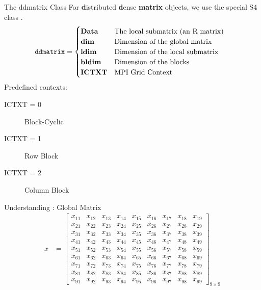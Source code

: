 \begin{frame}
  \begin{block}{The ddmatrix Class}\pause
    For \textbf{d}istributed \textbf{d}ense \textbf{matrix} objects,
    we use the special S4 class .
    \begin{align*}
      \hspace{.1cm}\text{\code{ddmatrix}}&=\begin{cases}
        $\textbf{Data}$ & $The local submatrix (an R matrix)$\\
        $\textbf{dim}$ & $Dimension of the global matrix$\\
        $\textbf{ldim}$ & $Dimension of the local submatrix$\\
        $\textbf{bldim}$ & $Dimension of the blocks$\\
        $\textbf{ICTXT}$ & $MPI Grid Context$
      \end{cases}
    \end{align*}
    Predefined contexts:
    \begin{description}
      \item[ICTXT = 0] Block-Cyclic
      \item[ICTXT = 1] Row Block
      \item[ICTXT = 2] Column Block
    \end{description}
  \end{block}
\end{frame}

\begin{frame}
  \begin{exampleblock}{Understanding : Global Matrix}
    \begin{align*}
      x &= \left[
          \begin{array}{lllllllll}
            x_{11} & x_{12} & x_{13} & x_{14} & x_{15} & x_{16} & x_{17} & x  _{18} & x_{19}\\
            x_{21} & x_{22} & x_{23} & x_{24} & x_{25} & x_{26} & x_{27} & x  _{28} & x_{29}\\
            x_{31} & x_{32} & x_{33} & x_{34} & x_{35} & x_{36} & x_{37} & x  _{38} & x_{39}\\
            x_{41} & x_{42} & x_{43} & x_{44} & x_{45} & x_{46} & x_{47} & x  _{48} & x_{49}\\
            x_{51} & x_{52} & x_{53} & x_{54} & x_{55} & x_{56} & x_{57} & x  _{58} & x_{59}\\
            x_{61} & x_{62} & x_{63} & x_{64} & x_{65} & x_{66} & x_{67} & x  _{68} & x_{69}\\
            x_{71} & x_{72} & x_{73} & x_{74} & x_{75} & x_{76} & x_{77} & x  _{78} & x_{79}\\
            x_{81} & x_{82} & x_{83} & x_{84} & x_{85} & x_{86} & x_{87} & x  _{88} & x_{89}\\
            x_{91} & x_{92} & x_{93} & x_{94} & x_{95} & x_{96} & x_{97} & x  _{98} & x_{99}
          \end{array}
        \right]_{9\times 9}
    \end{align*}
  \end{exampleblock}
\end{frame}

